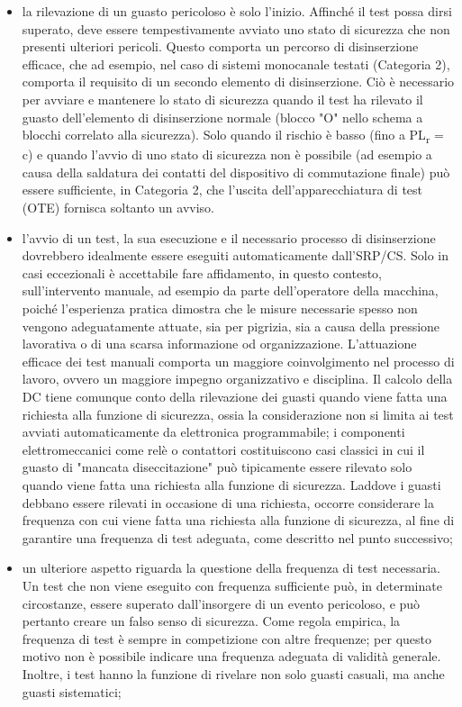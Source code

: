 \begin{itemize}
    \item la rilevazione di un guasto pericoloso è solo l'inizio. Affinché il test possa dirsi superato, deve essere tempestivamente avviato uno stato di sicurezza che non presenti ulteriori pericoli. Questo comporta un percorso di disinserzione efficace, che ad esempio, nel caso di sistemi monocanale testati (Categoria 2), comporta il requisito di un secondo elemento di disinserzione. Ciò è necessario per avviare e mantenere lo stato di sicurezza quando il test ha rilevato il guasto dell'elemento di disinserzione normale (blocco "O" nello schema a blocchi correlato alla sicurezza). Solo quando il rischio è basso (fino a PL\textsubscript{r} = c) e quando l'avvio di uno stato di sicurezza non è possibile (ad esempio a causa della saldatura dei contatti del dispositivo di commutazione finale) può essere sufficiente, in Categoria 2, che l'uscita dell'apparecchiatura di test (OTE) fornisca soltanto un avviso.
    \item l'avvio di un test, la sua esecuzione e il necessario processo di disinserzione dovrebbero idealmente essere eseguiti automaticamente dall'SRP/CS. Solo in casi eccezionali è accettabile fare affidamento, in questo contesto, sull'intervento manuale, ad esempio da parte dell'operatore della macchina, poiché l'esperienza pratica dimostra che le misure necessarie spesso non vengono adeguatamente attuate, sia per pigrizia, sia a causa della pressione lavorativa o di una scarsa informazione od organizzazione. L'attuazione efficace dei test manuali comporta un maggiore coinvolgimento nel processo di lavoro, ovvero un maggiore impegno organizzativo e disciplina. Il calcolo della DC tiene comunque conto della rilevazione dei guasti quando viene fatta una richiesta alla funzione di sicurezza, ossia la considerazione non si limita ai test avviati automaticamente da elettronica programmabile; i componenti elettromeccanici come relè o contattori costituiscono casi classici in cui il guasto di "mancata diseccitazione" può tipicamente essere rilevato solo quando viene fatta una richiesta alla funzione di sicurezza. Laddove i guasti debbano essere rilevati in occasione di una richiesta, occorre considerare la frequenza con cui viene fatta una richiesta alla funzione di sicurezza, al fine di garantire una frequenza di test adeguata, come descritto nel punto successivo;
    \item un ulteriore aspetto riguarda la questione della frequenza di test necessaria. Un test che non viene eseguito con frequenza sufficiente può, in determinate circostanze, essere superato dall'insorgere di un evento pericoloso, e può pertanto creare un falso senso di sicurezza. Come regola empirica, la frequenza di test è sempre in competizione con altre frequenze; per questo motivo non è possibile indicare una frequenza adeguata di validità generale. Inoltre, i test hanno la funzione di rivelare non solo guasti casuali, ma anche guasti sistematici;
\end{itemize}

